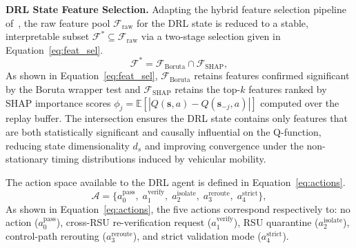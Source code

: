 \textbf{DRL State Feature Selection.}
Adapting the hybrid feature selection pipeline
of~\cite{satpathy2025cloud}, the raw feature pool
$\mathcal{F}_{\mathrm{raw}}$ for the DRL state
is reduced to a stable, interpretable subset
$\mathcal{F}^* \subseteq \mathcal{F}_{\mathrm{raw}}$ via a two-stage selection given in Equation~\eqref{eq:feat_sel}.
\begin{equation}
\mathcal{F}^* = \mathcal{F}_{\mathrm{Boruta}}
  \cap \mathcal{F}_{\mathrm{SHAP}},
\label{eq:feat_sel}
\end{equation}
As shown in Equation~\eqref{eq:feat_sel},
$\mathcal{F}_{\mathrm{Boruta}}$ retains features
confirmed significant by the Boruta wrapper test and
$\mathcal{F}_{\mathrm{SHAP}}$ retains the top-$k$
features ranked by SHAP importance scores
$\phi_j = \mathbb{E}[|Q(\mathbf{s},a) -
Q(\mathbf{s}_{-j},a)|]$ computed over the replay
buffer. The intersection ensures the DRL state
contains only features that are both statistically
significant and causally influential on the
Q-function, reducing state dimensionality $d_s$
and improving convergence under the non-stationary
timing distributions induced by vehicular mobility.

The action space available to the DRL agent is defined in
Equation~\eqref{eq:actions}.
\begin{equation}
\mathcal{A} = \bigl\{
  a_0^{\mathrm{pass}},\;
  a_1^{\mathrm{verify}},\;
  a_2^{\mathrm{isolate}},\;
  a_3^{\mathrm{reroute}},\;
  a_4^{\mathrm{strict}}
\bigr\},
\label{eq:actions}
\end{equation}
As shown in Equation~\eqref{eq:actions}, the five actions
correspond respectively to: no action
($a_0^{\mathrm{pass}}$), cross-RSU re-verification request
($a_1^{\mathrm{verify}}$), RSU quarantine
($a_2^{\mathrm{isolate}}$), control-path rerouting
($a_3^{\mathrm{reroute}}$), and strict validation mode
($a_4^{\mathrm{strict}}$).

